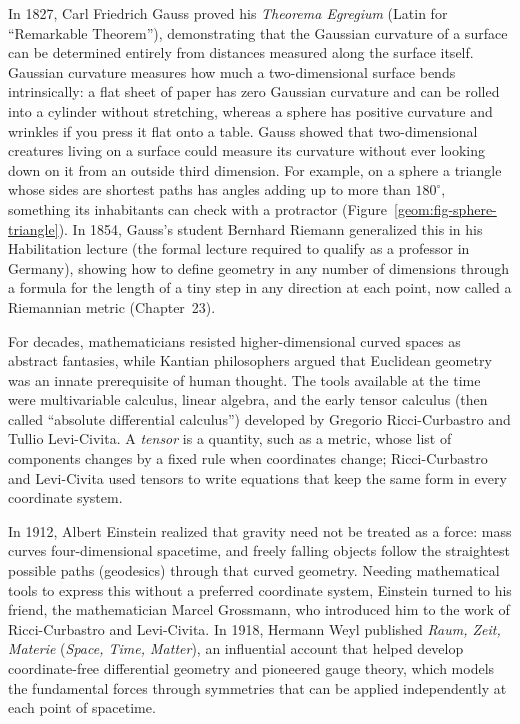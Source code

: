 \begin{historybox}
In 1827, Carl Friedrich Gauss proved his \emph{Theorema Egregium} (Latin for ``Remarkable Theorem''), demonstrating that the Gaussian curvature of a surface can be determined entirely from distances measured along the surface itself. Gaussian curvature measures how much a two-dimensional surface bends intrinsically: a flat sheet of paper has zero Gaussian curvature and can be rolled into a cylinder without stretching, whereas a sphere has positive curvature and wrinkles if you press it flat onto a table. Gauss showed that two-dimensional creatures living on a surface could measure its curvature without ever looking down on it from an outside third dimension. For example, on a sphere a triangle whose sides are shortest paths has angles adding up to more than $180^\circ$, something its inhabitants can check with a protractor (Figure~\ref{geom:fig-sphere-triangle}). In 1854, Gauss's student Bernhard Riemann generalized this in his Habilitation lecture (the formal lecture required to qualify as a professor in Germany), showing how to define geometry in any number of dimensions through a formula for the length of a tiny step in any direction at each point, now called a Riemannian metric (Chapter~23).

For decades, mathematicians resisted higher-dimensional curved spaces as abstract fantasies, while Kantian philosophers argued that Euclidean geometry was an innate prerequisite of human thought. The tools available at the time were multivariable calculus, linear algebra, and the early tensor calculus (then called ``absolute differential calculus'') developed by Gregorio Ricci-Curbastro and Tullio Levi-Civita. A \emph{tensor} is a quantity, such as a metric, whose list of components changes by a fixed rule when coordinates change; Ricci-Curbastro and Levi-Civita used tensors to write equations that keep the same form in every coordinate system.

In 1912, Albert Einstein realized that gravity need not be treated as a force: mass curves four-dimensional spacetime, and freely falling objects follow the straightest possible paths (geodesics) through that curved geometry. Needing mathematical tools to express this without a preferred coordinate system, Einstein turned to his friend, the mathematician Marcel Grossmann, who introduced him to the work of Ricci-Curbastro and Levi-Civita. In 1918, Hermann Weyl published \emph{Raum, Zeit, Materie} (\emph{Space, Time, Matter}), an influential account that helped develop coordinate-free differential geometry and pioneered gauge theory, which models the fundamental forces through symmetries that can be applied independently at each point of spacetime.


\end{historybox}

